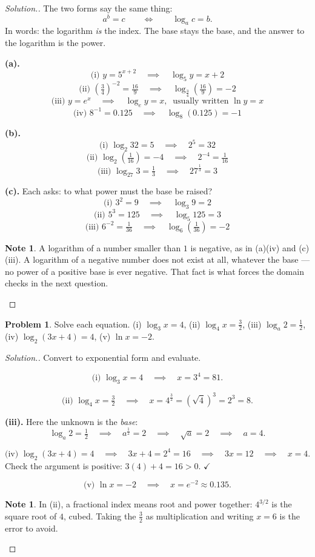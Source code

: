 \documentclass[11pt,a4paper]{article}
\theoremstyle{definition}
\newtheorem{note}[thm]{Note}
\newtheorem{problemx}{Problem}[section]
\newenvironment{problem}{\begin{problemx}}{\end{problemx}}
\newenvironment{solution}
  {\renewcommand{\qedsymbol}{}\begin{proof}[\textit{Solution}.]}
  {\end{proof}}
\let\amscheckmark\checkmark
\renewcommand{\checkmark}{\ensuremath{\amscheckmark}}
\begin{document}
\begin{solution}
The two forms say the same thing:
$$a^b=c\qquad\Longleftrightarrow\qquad \log_a c=b.$$
In words: the logarithm \emph{is} the index. The base stays the base, and the answer to
the logarithm is the power.

\textbf{(a).}
$$\text{(i) } y=5^{x+2}\quad\implies\quad \log_5 y=x+2$$
$$\text{(ii) } \left(\tfrac{3}{4}\right)^{-2}=\tfrac{16}{9}\quad\implies\quad
\log_{\frac{3}{4}}\left(\tfrac{16}{9}\right)=-2$$
$$\text{(iii) } y=e^x\quad\implies\quad \log_e y=x,\ \text{ usually written } \ln y=x$$
$$\text{(iv) } 8^{-1}=0.125\quad\implies\quad \log_8(0.125)=-1$$

\textbf{(b).}
$$\text{(i) } \log_2 32=5\quad\implies\quad 2^5=32$$
$$\text{(ii) } \log_2\left(\tfrac{1}{16}\right)=-4\quad\implies\quad 2^{-4}=\tfrac{1}{16}$$
$$\text{(iii) } \log_{27}3=\tfrac{1}{3}\quad\implies\quad 27^{\frac{1}{3}}=3$$

\textbf{(c).} Each asks: to what power must the base be raised?
$$\text{(i) } 3^2=9\quad\implies\quad \log_3 9=2$$
$$\text{(ii) } 5^3=125\quad\implies\quad \log_5 125=3$$
$$\text{(iii) } 6^{-2}=\tfrac{1}{36}\quad\implies\quad
\log_6\left(\tfrac{1}{36}\right)=-2$$

\begin{note}
A logarithm of a number smaller than $1$ is negative, as in (a)(iv) and (c)(iii). A
logarithm of a negative number does not exist at all, whatever the base --- no power of
a positive base is ever negative. That fact is what forces the domain checks in the
next question.
\end{note}
\end{solution}

\begin{problem}
Solve each equation.
\quad (i) $\log_3 x=4$, \quad (ii) $\log_4 x=\frac{3}{2}$, \quad
(iii) $\log_a 2=\frac{1}{2}$, \quad (iv) $\log_2(3x+4)=4$, \quad (v) $\ln x=-2$.
\end{problem}

\begin{solution}
Convert to exponential form and evaluate.

$$\text{(i) } \log_3 x=4\quad\implies\quad x=3^4=81.$$

$$\text{(ii) } \log_4 x=\tfrac{3}{2}\quad\implies\quad
x=4^{\frac{3}{2}}=\left(\sqrt{4}\right)^3=2^3=8.$$

\textbf{(iii).} Here the unknown is the \emph{base}:
$$\log_a 2=\tfrac{1}{2}\quad\implies\quad a^{\frac{1}{2}}=2\quad\implies\quad
\sqrt{a}=2\quad\implies\quad a=4.$$

$$\text{(iv) } \log_2(3x+4)=4\quad\implies\quad 3x+4=2^4=16\quad\implies\quad
3x=12\quad\implies\quad x=4.$$
Check the argument is positive: $3(4)+4=16>0$. $\checkmark$

$$\text{(v) } \ln x=-2\quad\implies\quad x=e^{-2}\approx 0.135.$$

\begin{note}
In (ii), a fractional index means root and power together: $4^{3/2}$ is the square root
of $4$, cubed. Taking the $\frac{3}{2}$ as multiplication and writing $x=6$ is the
error to avoid.
\end{note}
\end{solution}
\end{document}
